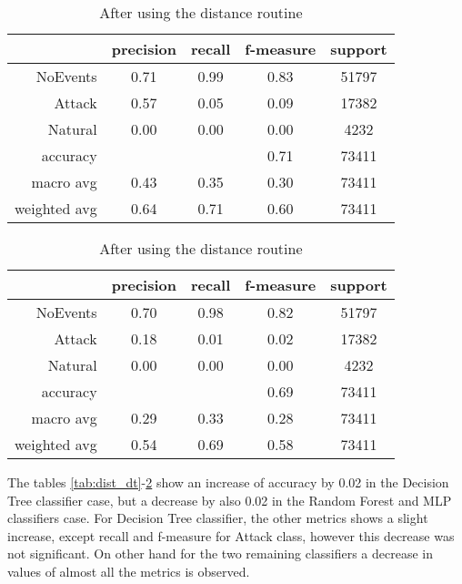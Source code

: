 \begin{table}[H]
    \centering \footnotesize
    \caption{Distance routine results for MLP classifier}  \label{tab:dist_mlp}
    \begin{subtable}[t]{.5\linewidth}
        \centering
        \caption{Before using the distance routine} 
        \begin{tabular}{rcccc}\toprule
            & precision    &recall & f-measure  & support \\\midrule
            NoEvents   &    0.71 &     0.99 &     0.83&    51797\\
            Attack     &  0.57   &   0.05   &   0.09  &   17382\\
           Natural     &  0.00   &   0.00   &   0.00  &    4232\\    
          accuracy     &         &          &   0.71  &   73411\\
         macro avg     &  0.43   &   0.35   &   0.30  &   73411\\
      weighted avg     &  0.64   &   0.71   &   0.60  &   73411\\ \bottomrule
        \end{tabular}
    \end{subtable}%
    \begin{subtable}[t]{.5\linewidth}
        \centering
        \caption{After using the distance routine} 
        \begin{tabular}{rcccc}\toprule
         &   precision    &recall & f-measure &  support  \\\midrule
    
         NoEvents  &     0.70 &     0.98 &     0.82 &  51797\\
         Attack    &   0.18   &   0.01   &   0.02   &  17382\\
        Natural    &   0.00   &   0.00   &   0.00   &   4232\\
       accuracy    &          &          &   0.69   &  73411\\
      macro avg    &   0.29   &   0.33   &   0.28   &  73411\\
   weighted avg    &   0.54   &   0.69   &   0.58   &  73411\\  \bottomrule
        \end{tabular}
    \end{subtable}
\end{table}

The tables \ref{tab:dist_dt}-\ref{tab:dist_mlp} show an increase of accuracy by 0.02 in the Decision Tree classifier case, but a decrease by also 0.02 in the Random Forest and MLP classifiers case. For Decision Tree classifier, the other metrics shows a slight increase, except recall and f-measure for Attack class, however this decrease was not significant. On other hand for the two remaining classifiers a decrease in values of almost all the metrics is observed.

